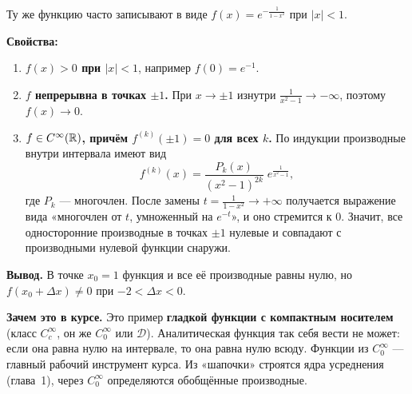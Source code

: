 Ту же функцию часто записывают в виде $f(x) = e^{-\frac{1}{1 - x^2}}$ при $|x| < 1$.

\textbf{Свойства:}
\begin{enumerate}
  \item \textbf{$f(x) > 0$ при $|x| < 1$}, например $f(0) = e^{-1}$.
  \item \textbf{$f$ непрерывна в точках $\pm 1$.} При $x \to \pm 1$ изнутри
        $\frac{1}{x^2-1} \to -\infty$, поэтому $f(x) \to 0$.
  \item \textbf{$f \in C^\infty(\mathbb{R})$, причём $f^{(k)}(\pm 1) = 0$ для всех $k$.}
        По индукции производные внутри интервала имеют вид
        \[
          f^{(k)}(x) = \frac{P_k(x)}{(x^2-1)^{2k}}\; e^{\frac{1}{x^2-1}},
        \]
        где $P_k$ — многочлен. После замены $t = \frac{1}{1-x^2} \to +\infty$ получается
        выражение вида «многочлен от $t$, умноженный на $e^{-t}$», и оно стремится к $0$.
        Значит, все односторонние производные в точках $\pm 1$ нулевые и совпадают
        с производными нулевой функции снаружи.
\end{enumerate}

\textbf{Вывод.} В точке $x_0 = 1$ функция и все её производные равны нулю,
но $f(x_0 + \Delta x) \neq 0$ при $-2 < \Delta x < 0$.

\begin{idea}
\textbf{Зачем это в курсе.} Это пример \textbf{гладкой функции с компактным носителем}
(класс $C_c^\infty$, он же $C_0^\infty$ или $\mathcal{D}$). Аналитическая функция так себя
вести не может: если она равна нулю на интервале, то она равна нулю всюду. Функции из
$C_0^\infty$ — главный рабочий инструмент курса. Из «шапочки» строятся ядра усреднения
(глава~1), через $C_0^\infty$ определяются обобщённые производные.
\end{idea}
